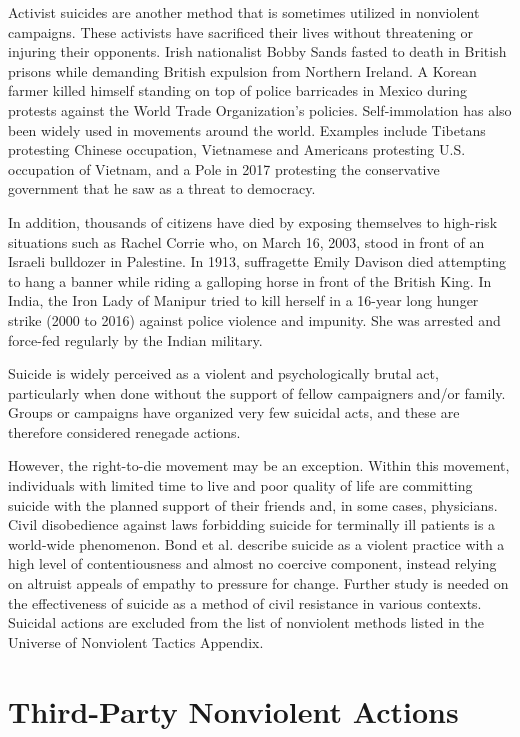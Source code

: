 \documentclass[twoside,a4paper,12pt,fleqn,openany]{extbook}
\begin{document}
Activist suicides are another method that is sometimes utilized in nonviolent campaigns. These activists have sacrificed their lives without threatening or injuring their opponents. Irish nationalist Bobby Sands fasted to death in British prisons while demanding British expulsion from Northern Ireland. A Korean farmer killed himself standing on top of police barricades in Mexico during protests against the World Trade Organization’s policies. Self-immolation has also been widely used in movements around the world. Examples include Tibetans protesting Chinese occupation, Vietnamese and Americans protesting U.S. occupation of Vietnam, and a Pole in 2017 protesting the conservative government that he saw as a threat to democracy.

In addition, thousands of citizens have died by exposing themselves to high-risk situations such as Rachel Corrie who, on March 16, 2003, stood in front of an Israeli bulldozer in Palestine. In 1913, suffragette Emily Davison died attempting to hang a banner while riding a galloping horse in front of the British King. In India, the Iron Lady of Manipur tried to kill herself in a 16-year long hunger strike (2000 to 2016) against police violence and impunity. She was arrested and force-fed regularly by the Indian military.

Suicide is widely perceived as a violent and psychologically brutal act, particularly when done without the support of fellow campaigners and/or family. Groups or campaigns have organized very few suicidal acts, and these are therefore considered renegade actions.

However, the right-to-die movement may be an exception. Within this movement, individuals with limited time to live and poor quality of life are committing suicide with the planned support of their friends and, in some cases, physicians. Civil disobedience against laws forbidding suicide for terminally ill patients is a world-wide phenomenon. Bond et al. describe suicide as a violent practice with a high level of contentiousness and almost no coercive component, instead relying on altruist appeals of empathy to pressure for change. Further study is needed on the effectiveness of suicide as a method of civil resistance in various contexts. Suicidal actions are excluded from the list of nonviolent methods listed in the Universe of Nonviolent Tactics Appendix.

\section*{Third-Party Nonviolent Actions}
\end{document}
